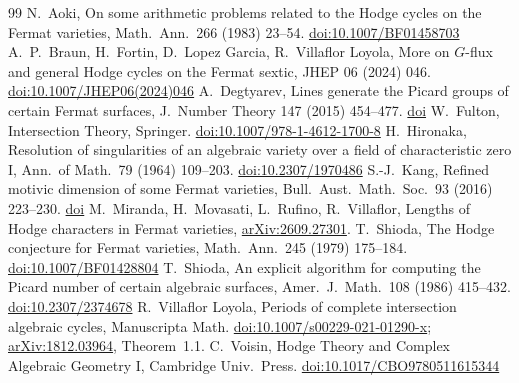 \documentclass[11pt]{amsart}
\theoremstyle{remark}\newtheorem{remark}[theorem]{Remark}
\begin{document}
\begin{thebibliography}{99}
 N.~Aoki, On some arithmetic problems related to the Hodge cycles on the Fermat varieties, Math.\ Ann.\ 266 (1983) 23--54. \href{https://doi.org/10.1007/BF01458703}{doi:10.1007/BF01458703}
 A.~P.~Braun, H.~Fortin, D.~Lopez Garcia, R.~Villaflor Loyola, More on $G$-flux and general Hodge cycles on the Fermat sextic, JHEP 06 (2024) 046. \href{https://doi.org/10.1007/JHEP06(2024)046}{doi:10.1007/JHEP06(2024)046}
 A.~Degtyarev, Lines generate the Picard groups of certain Fermat surfaces, J.\ Number Theory 147 (2015) 454--477. \href{https://doi.org/10.1016/j.jnt.2014.07.020}{doi}
 W.~Fulton, Intersection Theory, Springer. \href{https://doi.org/10.1007/978-1-4612-1700-8}{doi:10.1007/978-1-4612-1700-8}
 H.~Hironaka, Resolution of singularities of an algebraic variety over a field of characteristic zero I, Ann.\ of Math.\ 79 (1964) 109--203. \href{https://doi.org/10.2307/1970486}{doi:10.2307/1970486}
 S.-J.~Kang, Refined motivic dimension of some Fermat varieties, Bull.\ Aust.\ Math.\ Soc.\ 93 (2016) 223--230. \href{https://doi.org/10.1017/S0004972715001379}{doi}
 M.~Miranda, H.~Movasati, L.~Rufino, R.~Villaflor, Lengths of Hodge characters in Fermat varieties, \href{https://arxiv.org/abs/2609.27301}{arXiv:2609.27301}.
 T.~Shioda, The Hodge conjecture for Fermat varieties, Math.\ Ann.\ 245 (1979) 175--184. \href{https://doi.org/10.1007/BF01428804}{doi:10.1007/BF01428804}
 T.~Shioda, An explicit algorithm for computing the Picard number of certain algebraic surfaces, Amer.\ J.\ Math.\ 108 (1986) 415--432. \href{https://doi.org/10.2307/2374678}{doi:10.2307/2374678}
 R.~Villaflor Loyola, Periods of complete intersection algebraic cycles, Manuscripta Math. \href{https://doi.org/10.1007/s00229-021-01290-x}{doi:10.1007/s00229-021-01290-x}; \href{https://arxiv.org/html/1812.03964}{arXiv:1812.03964}, Theorem~1.1.
 C.~Voisin, Hodge Theory and Complex Algebraic Geometry I, Cambridge Univ.\ Press. \href{https://doi.org/10.1017/CBO9780511615344}{doi:10.1017/CBO9780511615344}
\end{thebibliography}
\end{document}
